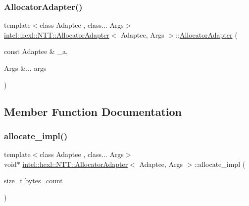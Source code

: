 \mbox{\label{structintel_1_1hexl_1_1NTT_1_1AllocatorAdapter_aee97fbd36cf2299db87f6dbe75f12396}} 
\subsubsection{\texorpdfstring{Allocator\+Adapter()}{AllocatorAdapter()}\hspace{0.1cm}{\footnotesize\ttfamily [2/2]}}
{\footnotesize\ttfamily template$<$class Adaptee , class... Args$>$ \\
\hyperlink{structintel_1_1hexl_1_1NTT_1_1AllocatorAdapter}{intel\+::hexl\+::\+N\+T\+T\+::\+Allocator\+Adapter}$<$ Adaptee, Args $>$\+::\hyperlink{structintel_1_1hexl_1_1NTT_1_1AllocatorAdapter}{Allocator\+Adapter} (\begin{DoxyParamCaption}\item[{const Adaptee \&}]{\+\_\+a,  }\item[{Args \&...}]{args }\end{DoxyParamCaption})}



\subsection{Member Function Documentation}
\mbox{\label{structintel_1_1hexl_1_1NTT_1_1AllocatorAdapter_a408a6a4b42aef1db5ab7e9b5c8ec2670}} 
\subsubsection{\texorpdfstring{allocate\+\_\+impl()}{allocate\_impl()}}
{\footnotesize\ttfamily template$<$class Adaptee , class... Args$>$ \\
void$\ast$ \hyperlink{structintel_1_1hexl_1_1NTT_1_1AllocatorAdapter}{intel\+::hexl\+::\+N\+T\+T\+::\+Allocator\+Adapter}$<$ Adaptee, Args $>$\+::allocate\+\_\+impl (\begin{DoxyParamCaption}\item[{size\+\_\+t}]{bytes\+\_\+count }\end{DoxyParamCaption})}

